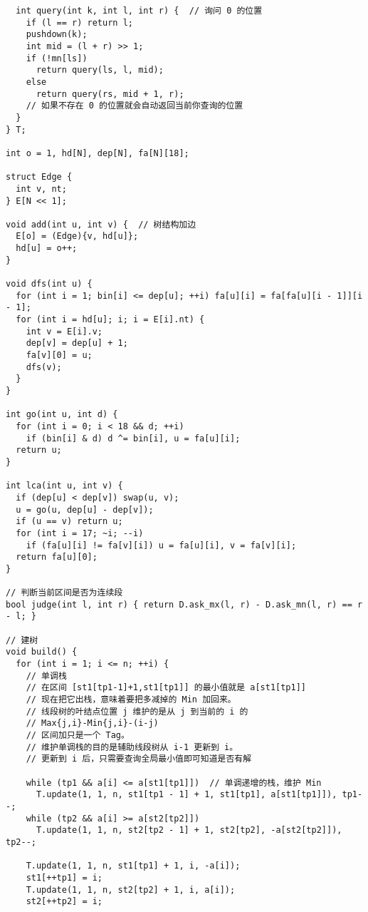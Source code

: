 \documentclass{ctexart}
\begin{document}
\begin{lstlisting}
  int query(int k, int l, int r) {  // 询问 0 的位置
    if (l == r) return l;
    pushdown(k);
    int mid = (l + r) >> 1;
    if (!mn[ls])
      return query(ls, l, mid);
    else
      return query(rs, mid + 1, r);
    // 如果不存在 0 的位置就会自动返回当前你查询的位置
  }
} T;

int o = 1, hd[N], dep[N], fa[N][18];

struct Edge {
  int v, nt;
} E[N << 1];

void add(int u, int v) {  // 树结构加边
  E[o] = (Edge){v, hd[u]};
  hd[u] = o++;
}

void dfs(int u) {
  for (int i = 1; bin[i] <= dep[u]; ++i) fa[u][i] = fa[fa[u][i - 1]][i - 1];
  for (int i = hd[u]; i; i = E[i].nt) {
    int v = E[i].v;
    dep[v] = dep[u] + 1;
    fa[v][0] = u;
    dfs(v);
  }
}

int go(int u, int d) {
  for (int i = 0; i < 18 && d; ++i)
    if (bin[i] & d) d ^= bin[i], u = fa[u][i];
  return u;
}

int lca(int u, int v) {
  if (dep[u] < dep[v]) swap(u, v);
  u = go(u, dep[u] - dep[v]);
  if (u == v) return u;
  for (int i = 17; ~i; --i)
    if (fa[u][i] != fa[v][i]) u = fa[u][i], v = fa[v][i];
  return fa[u][0];
}

// 判断当前区间是否为连续段
bool judge(int l, int r) { return D.ask_mx(l, r) - D.ask_mn(l, r) == r - l; }

// 建树
void build() {
  for (int i = 1; i <= n; ++i) {
    // 单调栈
    // 在区间 [st1[tp1-1]+1,st1[tp1]] 的最小值就是 a[st1[tp1]]
    // 现在把它出栈，意味着要把多减掉的 Min 加回来。
    // 线段树的叶结点位置 j 维护的是从 j 到当前的 i 的
    // Max{j,i}-Min{j,i}-(i-j)
    // 区间加只是一个 Tag。
    // 维护单调栈的目的是辅助线段树从 i-1 更新到 i。
    // 更新到 i 后，只需要查询全局最小值即可知道是否有解

    while (tp1 && a[i] <= a[st1[tp1]])  // 单调递增的栈，维护 Min
      T.update(1, 1, n, st1[tp1 - 1] + 1, st1[tp1], a[st1[tp1]]), tp1--;
    while (tp2 && a[i] >= a[st2[tp2]])
      T.update(1, 1, n, st2[tp2 - 1] + 1, st2[tp2], -a[st2[tp2]]), tp2--;

    T.update(1, 1, n, st1[tp1] + 1, i, -a[i]);
    st1[++tp1] = i;
    T.update(1, 1, n, st2[tp2] + 1, i, a[i]);
    st2[++tp2] = i;


\end{lstlisting}
\end{document}
